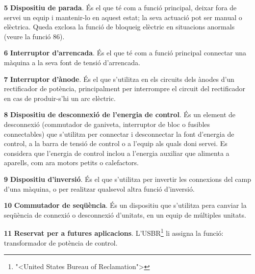 \begin{multicols}{2}
\begin{list}{}
\item[\textbf{5}]   \textbf{Dispositiu de parada}. \'{E}s el que
t\'{e} com a funci\'{o} principal, deixar fora de servei un equip i
mantenir-lo en aquest estat; la seva actuaci\'{o} pot ser manual o
el\`{e}ctrica. Queda exclosa la funci\'{o} de bloqueig el\`{e}ctric en
situacions anormals (veure la funci\'{o} 86).

\item[\textbf{6}]  \textbf{Interruptor d'arrencada}. \'{E}s
el que t\'{e} com a funci\'{o} principal connectar una m\`{a}quina a la seva font de tensi\'{o} d'arrencada.

\item[\textbf{7}]  \textbf{Interruptor d'\`{a}node}. \'{E}s el que
s'utilitza en els circuits dels \`{a}nodes d'un rectificador de
pot\`{e}ncia, principalment per interrompre el circuit del rectificador
en  cas de produir-s'hi un arc el\`{e}ctric.

\item[\textbf{8}]  \textbf{Dispositiu de desconnexi\'{o} de l'energia
de control}. \'{E}s un element de desconnexi\'{o} (commutador de ganiveta,
interruptor de bloc o fusibles connectables) que s'utilitza per
connectar i desconnectar la font d'energia de control,  a la barra
de tensi\'{o} de control o a l'equip als quals doni servei. Es considera
que l'energia de control inclou a l'energia auxiliar que alimenta a
aparells, com ara motors petits o calefactors.

\item[\textbf{9}]  \textbf{Dispositiu d'inversi\'{o}}. \'{E}s el
que s'utilitza per invertir les connexions del camp d'una m\`{a}quina, o
per realitzar qualsevol altra funci\'{o}  d'inversi\'{o}.

\item[\textbf{10}]  \textbf{Commutador de seq\"{u}\`{e}ncia}. \'{E}s un
dispositiu que s'utilitza pera canviar la seq\"{u}\`{e}ncia de connexi\'{o} o
desconnexi\'{o} d'unitats, en un equip de m\'{u}ltiples unitats.

\item[\textbf{11}] \textbf{Reservat per a  futures aplicacions}.
L'\textsf{USBR}\footnote{{"<}United States Bureau of Reclamation{">}}
 li assigna la funci\'{o}: transformador de pot\`{e}ncia de control.


\end{list}
\end{multicols}

